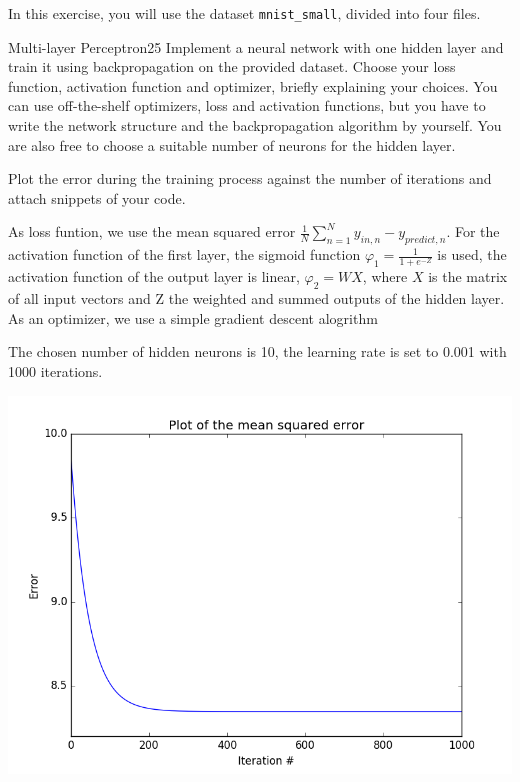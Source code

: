 \newif\ifvimbug
\vimbugfalse

\ifvimbug

\fi

In this exercise, you will use the dataset \texttt{mnist\_small}, divided into four files.

\begin{questions}


\begin{question}{Multi-layer Perceptron}{25}
Implement a neural network with one hidden layer and train it using backpropagation on the provided dataset. Choose your loss function, activation function and optimizer, briefly explaining your choices. You can use off-the-shelf optimizers, loss and activation functions, but you have to write the network structure and the backpropagation algorithm by yourself. You are also free to choose a suitable number of neurons for the hidden layer.

Plot the error during the training process against the number of iterations and attach snippets of your code. 


\begin{answer}
	As loss funtion, we use the mean squared error $\frac{1}{N }\sum_{n=1}^N y_{in,n} - y_{predict,n}$. For the activation function of the first layer, the sigmoid function $\varphi_1 = \frac{1}{1+e^{-Z}}$ is used, the activation function of the output layer is linear, $\varphi_2 = WX$, where $X$ is the matrix of all input vectors and Z the weighted and summed outputs of the hidden layer. As an optimizer, we use a simple gradient descent alogrithm
	

\end{answer}

The chosen number of hidden neurons is 10, the learning rate is set to 0.001 with 1000 iterations.

\centering\includegraphics[width=0.7\linewidth]{4-1.png}




\end{question}
\end{questions}

